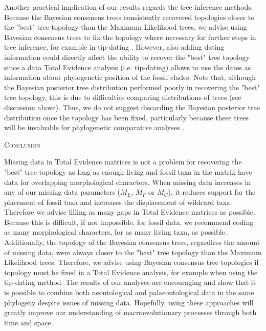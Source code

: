 \documentclass[12pt,letterpaper]{article}
\renewcommand{\section}[1]{%
\bigskip
\begin{center}
\begin{Large}
\normalfont\scshape #1
\medskip
\end{Large}
\end{center}}
\begin{document}
Another practical implication of our results regards the tree inference methods. Because the Bayesian consensus trees consistently recovered topologies closer to the "best" tree topology than the Maximum Likelihood trees, we advise using Bayesian consensus trees to fix the topology where necessary for further steps in tree inference, for example in tip-dating \citep{ronquista2012,BEASTmaster}.
However, also adding dating information could directly affect the ability to recover the "best" tree topology since a data Total Evidence analysis (i.e. tip-dating) allows to use the dates as information about phylogenetic position of the fossil clades.
Note that, although the Bayesian posterior tree distribution performed poorly in recovering the "best" tree topology, this is due to difficulties comparing distributions of trees (see discussion above). Thus, we do not suggest discarding the Bayesian posterior tree distribution once the topology has been fixed, particularly because these trees will be invaluable for phylogenetic comparative analyses \citep[e.g.][]{jetzthe2012}.

%
%

\section{Conclusion}

Missing data in Total Evidence matrices is not a problem for recovering the "best" tree topology as long as enough living and fossil taxa in the matrix have data for overlapping morphological characters. When missing data increases in any of our missing data parameters ($M_{L}$, $M_{F}$ or $M_{C}$), it reduces support for the placement of fossil taxa and increases the displacement of wildcard taxa. Therefore we advise filling as many gaps in Total Evidence matrices as possible. Because this is difficult, if not impossible, for fossil data, we recommend coding as many morphological characters, for as many living taxa, as possible. Additionally, the topology of the Bayesian consensus trees, regardless the amount of missing data, were always closer to the "best" tree topology than the Maximum Likelihood trees. Therefore, we advise using Bayesian consensus tree topologies if topology must be fixed in a Total Evidence analysis, for example when using the tip-dating method. The results of our analyses are encouraging and show that it is possible to combine both neontological and palaeontological data in the same phylogeny despite issues of missing data. Hopefully, using these approaches will greatly improve our understanding of macroevolutionary processes through both time and space.
\end{document}
